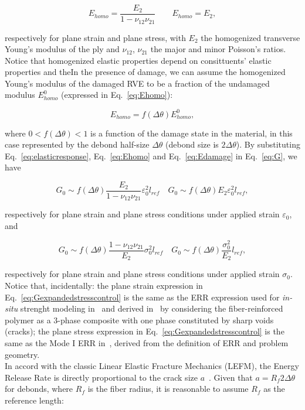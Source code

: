 \documentclass[a4paper,fleqn]{cas-dc}
\begin{document}
\begin{equation}\label{eq:Ehomo}
E_{homo}=\frac{E_{2}}{1-\nu_{12}\nu_{21}}\qquad E_{homo}=E_{2},
\end{equation}

respectively for plane strain and plane stress, with $E_{2}$ the homogenized transverse Young's modulus of the ply and $\nu_{12}$, $\nu_{21}$ the major and minor Poisson's ratios. Notice that homogenized elastic properties depend on consittuents' elastic properties and theIn the presence of damage, we can assume the homogenized Young's modulus of the damaged RVE to be a fraction of the undamaged modulus $E_{homo}^{0}$ (expressed in Eq.~\ref{eq:Ehomo}):

\begin{equation}\label{eq:Edamage}
E_{homo}=f\left(\Delta\theta\right)E_{homo}^{0},
\end{equation}

where $0<f\left(\Delta\theta\right)<1$ is a function of the damage state in the material, in this case represented by the debond half-size $\Delta\theta$ (debond size is $2\Delta\theta$). By substituting Eq.~\ref{eq:elasticresponse}, Eq.~\ref{eq:Ehomo} and Eq.~\ref{eq:Edamage} in Eq.~\ref{eq:G}, we have

\begin{equation}\label{eq:Gexpandedstraincontrol}
G_{0}\sim f\left(\Delta\theta\right)\frac{E_{2}}{1-\nu_{12}\nu_{21}}\varepsilon_{0}^{2}l_{ref}\quad G_{0}\sim f\left(\Delta\theta\right)E_{2}\varepsilon_{0}^{2}l_{ref},
\end{equation}

respectively for plane strain and plane stress conditions under applied strain $\varepsilon_{0}$, and

\begin{equation}\label{eq:Gexpandedstresscontrol}
G_{0}\sim f\left(\Delta\theta\right)\frac{1-\nu_{12}\nu_{21}}{E_{2}}\sigma_{0}^{2}l_{ref}\quad G_{0}\sim f\left(\Delta\theta\right)\frac{\sigma_{0}^{2}}{E_{2}}l_{ref},
\end{equation}

respectively for plane strain and plane stress conditions under applied strain $\sigma_{0}$. Notice that, incidentally: the plane strain expression in Eq.~\ref{eq:Gexpandedstresscontrol} is the same as the ERR expression used for \textit{in-situ} strenght modeling in~\cite{Camanho2006} and derived in~\cite{Laws1983} by considering the fiber-reinforced polymer as a 3-phase composite with one phase constituted by sharp voids (cracks); the plane stress expression in Eq.~\ref{eq:Gexpandedstresscontrol} is the same as the Mode I ERR in~\cite{Varna2018}, derived from the definition of ERR and problem geometry.\\
In accord with the classic Linear Elastic Fracture Mechanics (LEFM), the Energy Release Rate is directly proportional to the crack size $a$~\cite{Tada2000}. Given that $a=R_{f}2\Delta\theta$ for debonds, where $R_{f}$ is the fiber radius, it is reasonable to assume $R_{f}$ as the reference length:
\end{document}
